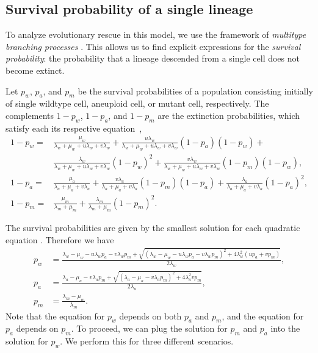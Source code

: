 \documentclass[12pt]{extarticle}
\begin{document}
\begin{appendices}
\renewcommand{\theequation}{\thesection\arabic{equation}}


\section{Survival probability of a single lineage}\label{sec:appendix-surv-prob}

To analyze evolutionary rescue in this model, we use the framework of \emph{multitype branching processes} \citep{harris1963theory, weissman2009rate}. 
This allows us to find explicit expressions for the \emph{survival probability}: the probability that a lineage descended from a single cell does not become extinct.

Let $p_w$, $p_a$, and $p_m$ be the survival probabilities of a population consisting initially of single wildtype cell, aneuploid cell, or mutant cell, respectively.
The complements $1-p_w$, $1-p_a$, and $1-p_m$ are the extinction probabilities, which satisfy each its respective equation~\citep{harris1963theory},
\begin{equation} \label{eq:extinction_prob}
\begin{aligned}
1-p_w = &\frac{\mu_w}{\lambda_w+\mu_w+u\lambda_w+v\lambda_w} + 
		  \frac{u\lambda_w}{\lambda_w+\mu_w+u\lambda_w+v\lambda_w}\left(1-p_a\right)\left(1-p_w\right) + \\
		  & \frac{\lambda_w}{\lambda_w+\mu_w+u\lambda_w+v\lambda_w}\left(1-p_w\right)^2 +
		  \frac{v\lambda_w}{\lambda_w+\mu_w+u\lambda_w+v\lambda_w}\left(1-p_m\right)\left(1-p_w\right) ,\\
1-p_a = &\frac{\mu_a}{\lambda_a+\mu_a+v\lambda_a}+\frac{v\lambda_a}{\lambda_a+\mu_a+v\lambda_a}\left(1-p_m\right)\left(1-p_a\right)+\frac{\lambda_a}{\lambda_a+\mu_a+v\lambda_a}\left(1-p_a\right)^2 ,\\
1-p_m = &\frac{\mu_m}{\lambda_m+\mu_m}+\frac{\lambda_m}{\lambda_m+\mu_m}\left(1-p_m\right)^2 .	 
\end{aligned}
\end{equation}

The survival probabilities are given by the smallest solution for each quadratic equation \citep{uecker2015adaptive}. Therefore we have
\begin{equation}\label{eq:survival_prob}
\begin{aligned}
p_w &= \frac{\lambda_w-\mu_w-u\lambda_wp_a-v\lambda_wp_m+\sqrt{\left(\lambda_w-\mu_w-u\lambda_wp_a-v\lambda_wp_m\right)^2+4\lambda_w^2\left(up_a+vp_m\right)}}{2\lambda_w} ,\\
p_a &= \frac{\lambda_a-\mu_a-v\lambda_ap_m+\sqrt{\left(\lambda_a-\mu_a-v\lambda_ap_m\right)^2+4\lambda_a^2vp_m}}{2\lambda_a}, \\
p_m &= \frac{\lambda_m-\mu_m}{\lambda_m} .
\end{aligned} 
\end{equation}
Note that the equation for $p_w$ depends on both $p_a$ and $p_m$, and the equation for $p_a$ depends on $p_m$.
To proceed, we can plug the solution for $p_m$ and $p_a$ into the solution for $p_w$. We perform this for three different scenarios.


\end{appendices}
\end{document}
